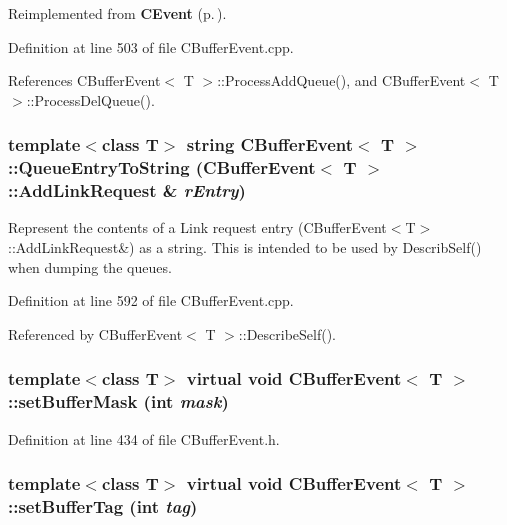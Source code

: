 Reimplemented from {\bf CEvent} {\rm (p.\,\pageref{classCEvent_b5})}.

Definition at line 503 of file CBuffer\-Event.cpp.

References CBuffer\-Event$<$ T $>$::Process\-Add\-Queue(), and CBuffer\-Event$<$ T $>$::Process\-Del\-Queue().
\subsubsection{\setlength{\rightskip}{0pt plus 5cm}template$<$class T$>$ string CBuffer\-Event$<$ T $>$::Queue\-Entry\-To\-String (CBuffer\-Event$<$ T $>$::{\bf Add\-Link\-Request} \& {\em r\-Entry})\hspace{0.3cm}{\tt  [protected]}}\label{classCBufferEvent_b3}


Represent the contents of a Link request entry (CBuffer\-Event$<$T$>$::Add\-Link\-Request\&) as a string. This is intended to be used by Describ\-Self() when dumping the queues. 

Definition at line 592 of file CBuffer\-Event.cpp.

Referenced by CBuffer\-Event$<$ T $>$::Describe\-Self().
\subsubsection{\setlength{\rightskip}{0pt plus 5cm}template$<$class T$>$ virtual void CBuffer\-Event$<$ T $>$::set\-Buffer\-Mask (int {\em mask})\hspace{0.3cm}{\tt  [inline, virtual]}}\label{classCBufferEvent_a13}




Definition at line 434 of file CBuffer\-Event.h.
\subsubsection{\setlength{\rightskip}{0pt plus 5cm}template$<$class T$>$ virtual void CBuffer\-Event$<$ T $>$::set\-Buffer\-Tag (int {\em tag})\hspace{0.3cm}{\tt  [inline, virtual]}}\label{classCBufferEvent_a12}




